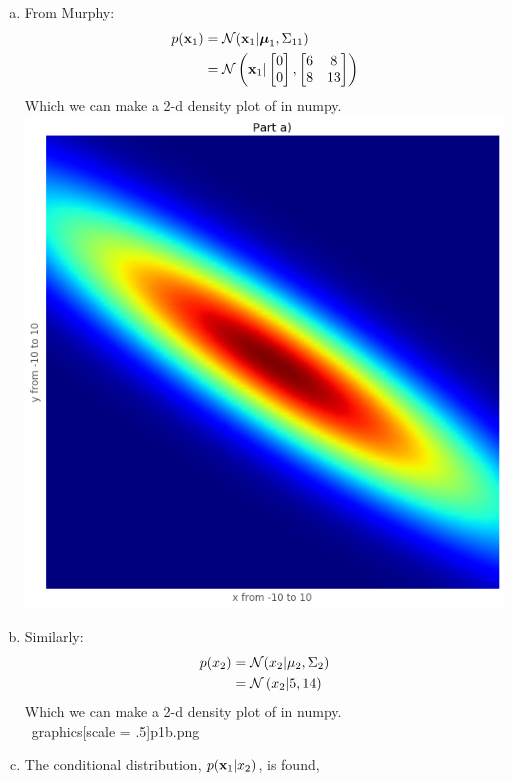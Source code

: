 \documentclass[12pt,letterpaper,fleqn]{hmcpset}
\begin{document}
\begin{solution}
    \begin{enumerate}[(a)]
        \item
            From Murphy: 
            \begin{align*}
                 p({\bf x}_1) &= {\cal N}({\bf x}_1|\hbox{\boldmath$\mu$}_1, \Sigma_{11}) \\
                 &= {\cal N} \left({\bf x}_1|\begin{bmatrix} 0\\0 \end{bmatrix}, \begin{bmatrix} 6 & 8\\ 8 & 13 \end{bmatrix} \right)
             \end{align*} 
             Which we can make a 2-d density plot of in numpy.\\
             \includegraphics[scale = .5]{p1a.png}
        \item
            Similarly: 
            \begin{align*}
                p(x_2) &= {\cal N}(x_2|\mu_2, \Sigma_2) \\
                 &= {\cal N} \left(x_2|5, 14 \right)
            \end{align*}
            Which we can make a 2-d density plot of in numpy.\\
            \ graphics[scale = .5]{p1b.png}
        \item
            The conditional distribution, $p({\bf x}_1 | x_2)$, is found,

\end{enumerate}
\end{solution}
\end{document}

